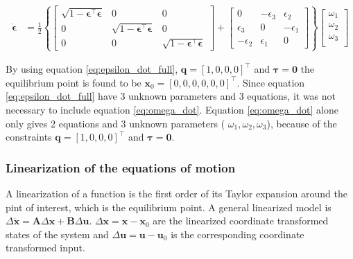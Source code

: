 \begin{equation}
    \begin{aligned}
	\dot{\boldsymbol{\epsilon}}
	&= 
	\frac{1}{2}
	\left \{
	\begin{bmatrix}
		\sqrt{1-\boldsymbol{\epsilon}^\top \boldsymbol{\epsilon}} & 0 &  0  \\
		0 & \sqrt{1-\boldsymbol{\epsilon}^\top \boldsymbol{\epsilon}} &   0   \\
		0 &  0  & \sqrt{1-\boldsymbol{\epsilon}^\top \boldsymbol{\epsilon}} 
	\end{bmatrix}
	+
	\begin{bmatrix}
		0 & -\epsilon_3 &  \epsilon_2   \\
		\epsilon_3 & 0 &   - \epsilon_1   \\
		-\epsilon_2 &  \epsilon_1  & 0
	\end{bmatrix}
	\right \} 
	\begin{bmatrix}
		\omega_1  \\
		\omega_2  \\
		\omega_3  \\
	\end{bmatrix}
	\end{aligned}
	\label{eq:epsilon_dot_full}
\end{equation}

By using equation \eqref{eq:epsilon_dot_full},   $\mathbf{q} = [1, 0, 0, 0]^\top$ and $\boldsymbol{\tau} = \boldsymbol{0}$ the equilibrium point  is found to be $\mathbf{x}_0 = [0, 0, 0, 0,0,0]^\top$. Since equation \eqref{eq:epsilon_dot_full} have 3 unknown parameters and 3 equations, it was not necessary to include equation \eqref{eq:omega_dot}. Equation \eqref{eq:omega_dot} alone only gives 2 equations and 3 unknown parameters ( $\omega_1, \omega_2, \omega_3$), because of the constraints  $\mathbf{q} = [1, 0, 0, 0]^\top$ and $\boldsymbol{\tau} = \boldsymbol{0}$.



\subsubsection*{Linearization of  the equations of motion}

A linearization of a function is the first order of its Taylor expansion around the pint of interest, which is the equilibrium point. A general linearized model is $ \Delta \dot{\mathbf{x}} = \mathbf{A} \Delta \mathbf{x} + \mathbf{B} \Delta \mathbf{u}$. $\Delta \mathbf{x} = \mathbf{x} - \mathbf{x}_0$ are the linearized coordinate transformed states of the system and $\Delta \mathbf{u} = \mathbf{u} - \mathbf{u}_0$ is the corresponding coordinate transformed input. 

